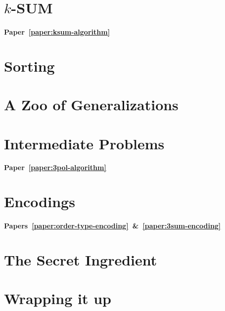 \section*{\(k\)-SUM}

\paragraph{Paper~\ref{paper:ksum-algorithm}}


\section*{Sorting}


\section*{A Zoo of Generalizations}





\section*{Intermediate Problems}

\paragraph{Paper~\ref{paper:3pol-algorithm}}


\section*{Encodings}

\paragraph{Papers~\ref{paper:order-type-encoding}~\&~\ref{paper:3sum-encoding}}


\section*{The Secret Ingredient}


\section*{Wrapping it up}

